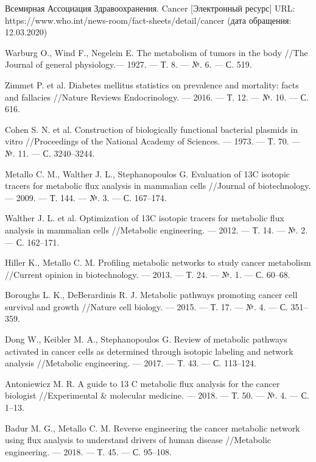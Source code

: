 \documentclass[a4paper, 12pt, left=30mm, right=15mm, top=20mm, bottom=20mm]{report}
\begin{document}
\begin{thebibliography}{XXXX}
	Всемирная Ассоциация Здравоохранения. Cancer [Электронный ресурс] URL: https://www.who.int/news-room/fact-sheets/detail/cancer (дата обращения: 12.03.2020)
	
	Warburg O., Wind F., Negelein E. The metabolism of tumors in the body //The Journal of general physiology.--- 1927. --- Т. 8. --- №. 6. --- С. 519.
	
	Zimmet P. et al. Diabetes mellitus statistics on prevalence and mortality: facts and fallacies //Nature Reviews Endocrinology. --- 2016. --- Т. 12. --- №. 10. --- С. 616.
	
	Cohen S. N. et al. Construction of biologically functional bacterial plasmids in vitro //Proceedings of the National Academy of Sciences. --- 1973. --- Т. 70. --- №. 11. --- С. 3240--3244.
	
	Metallo C. M., Walther J. L., Stephanopoulos G. Evaluation of 13C isotopic tracers for metabolic flux analysis in mammalian cells //Journal of biotechnology. --- 2009. --- Т. 144. --- №. 3. --- С. 167--174.
	
	Walther J. L. et al. Optimization of 13C isotopic tracers for metabolic flux analysis in mammalian cells //Metabolic engineering. --- 2012. --- Т. 14. --- №. 2. --- С. 162--171.
	
	Hiller K., Metallo C. M. Profiling metabolic networks to study cancer metabolism //Current opinion in biotechnology. --- 2013. --- Т. 24. --- №. 1. --- С. 60--68.
	
	Boroughs L. K., DeBerardinis R. J. Metabolic pathways promoting cancer cell survival and growth //Nature cell biology. --- 2015. --- Т. 17. --- №. 4. --- С. 351--359.
	
	Dong W., Keibler M. A., Stephanopoulos G. Review of metabolic pathways activated in cancer cells as determined through isotopic labeling and network analysis //Metabolic engineering. --- 2017. --- Т. 43. --- С. 113--124.
	
	Antoniewicz M. R. A guide to 13 C metabolic flux analysis for the cancer biologist //Experimental \& molecular medicine. --- 2018. --- Т. 50. --- №. 4. --- С. 1--13.
	
	Badur M. G., Metallo C. M. Reverse engineering the cancer metabolic network using flux analysis to understand drivers of human disease //Metabolic engineering. --- 2018. --- Т. 45. --- С. 95--108.
	

\end{thebibliography}
\end{document}
